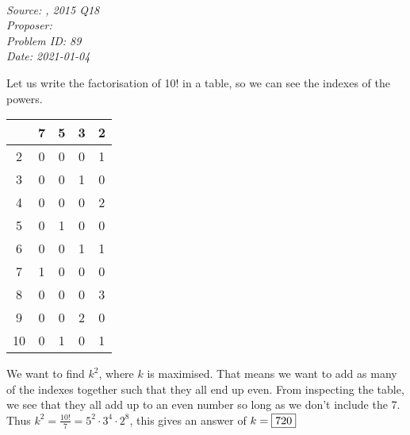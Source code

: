 \SSbreak\\
\emph{Source: \Csmc, 2015 Q18}\\
\emph{Proposer: \Pss}\\
\emph{Problem ID: 89}\\
\emph{Date: 2021-01-04}\\
\SSbreak

\bigskip

\begin{solution}\hfil\medskip
	
Let us write the factorisation of 10! in a table, so we can see  the indexes of the powers.

	\begin{table}[h!]
		\centering
		\begin{tabular}{c|cccc}
		   & 7 & 5 & 3 & 2 \\ \hline
		2  & 0 & 0 & 0 & 1 \\
		3  & 0 & 0 & 1 & 0 \\
		4  & 0 & 0 & 0 & 2 \\
		5  & 0 & 1 & 0 & 0 \\
		6  & 0 & 0 & 1 & 1 \\
		7  & 1 & 0 & 0 & 0 \\
		8  & 0 & 0 & 0 & 3 \\
		9  & 0 & 0 & 2 & 0 \\
		10 & 0 & 1 & 0 & 1
		\end{tabular}
		\end{table}

We want to find \(k^2\), where \(k\) is maximised. That means we want to add as many of the indexes together such that they all end up even. From inspecting the table, we see that they all add up to an even number so long as we don't include the 7. Thus \(k^2=\frac{10!}{7}=5^2\cdot3^4\cdot2^8\), this gives an answer of \(k=\fbox{720}\)
\end{solution}\bigskip
